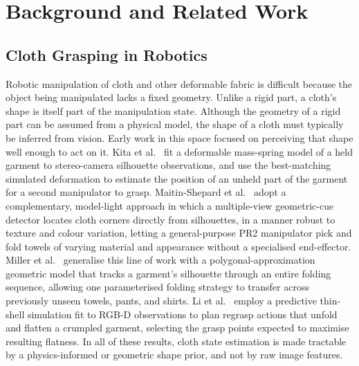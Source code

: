 \chapter{\rm\bfseries Background and Related Work}
\label{ch:background}

\section{Cloth Grasping in Robotics}

Robotic manipulation of cloth and other deformable fabric is difficult
because the object being manipulated lacks a fixed geometry. Unlike a
rigid part, a cloth's shape is itself part of the manipulation state.
Although the geometry of a rigid part can be assumed from a physical
model, the shape of a cloth must typically be inferred from vision.
Early work in this space focused on perceiving that shape well enough to
act on it. Kita et al.~\cite{kita2004deformablemodel} fit a deformable
mass-spring model of a held garment to stereo-camera silhouette
observations, and use the best-matching simulated deformation to estimate
the position of an unheld part of the garment for a second manipulator to
grasp. Maitin-Shepard et al.~\cite{maitinshepard2010clothgrasp} adopt a
complementary, model-light approach in which a multiple-view
geometric-cue detector locates cloth corners directly from silhouettes,
in a manner robust to texture and colour variation, letting a
general-purpose PR2 manipulator pick and fold towels of varying material
and appearance without a specialised end-effector. Miller et
al.~\cite{miller2012geometric} generalise this line of work with a
polygonal-approximation geometric model that tracks a garment's silhouette
through an entire folding sequence, allowing one parameterised folding
strategy to transfer across previously unseen towels, pants, and shirts.
Li et al.~\cite{li2015regrasping} employ a predictive thin-shell
simulation fit to RGB-D observations to plan regrasp actions that unfold
and flatten a crumpled garment, selecting the grasp points expected to
maximise resulting flatness. In all of these results, cloth state
estimation is made tractable by a physics-informed or geometric shape
prior, and not by raw image features.

